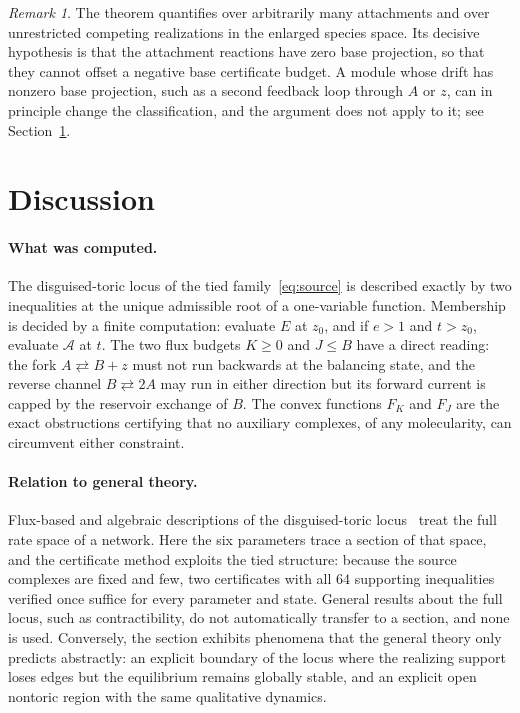 \documentclass[11pt,a4paper]{article}
\theoremstyle{plain}
\theoremstyle{definition}
\theoremstyle{remark}
\newtheorem{remark}[theorem]{Remark}
\newcommand{\rA}{\mathcal{A}}
\begin{document}
\begin{remark}
The theorem quantifies over arbitrarily many attachments and over unrestricted competing realizations in the enlarged species space. Its decisive hypothesis is that the attachment reactions have zero base projection, so that they cannot offset a negative base certificate budget. A module whose drift has nonzero base projection, such as a second feedback loop through $A$ or $z$, can in principle change the classification, and the argument does not apply to it; see Section~\ref{sec:discussion}.
\end{remark}

\section{Discussion}\label{sec:discussion}

\paragraph{What was computed.} The disguised-toric locus of the tied family~\eqref{eq:source} is described exactly by two inequalities at the unique admissible root of a one-variable function. Membership is decided by a finite computation: evaluate $E$ at $z_0$, and if $e>1$ and $t>z_0$, evaluate $\rA$ at $t$. The two flux budgets $K\ge0$ and $J\le B$ have a direct reading: the fork $A\rightleftarrows B+z$ must not run backwards at the balancing state, and the reverse channel $B\rightleftarrows2A$ may run in either direction but its forward current is capped by the reservoir exchange of $B$. The convex functions $F_K$ and $F_J$ are the exact obstructions certifying that no auxiliary complexes, of any molecularity, can circumvent either constraint.

\paragraph{Relation to general theory.} Flux-based and algebraic descriptions of the disguised-toric locus~\cite{Boros2026,MullerDeshpandeRegensburger2026} treat the full rate space of a network. Here the six parameters trace a section of that space, and the certificate method exploits the tied structure: because the source complexes are fixed and few, two certificates with all $64$ supporting inequalities verified once suffice for every parameter and state. General results about the full locus, such as contractibility, do not automatically transfer to a section, and none is used. Conversely, the section exhibits phenomena that the general theory only predicts abstractly: an explicit boundary of the locus where the realizing support loses edges but the equilibrium remains globally stable, and an explicit open nontoric region with the same qualitative dynamics.
\end{document}
